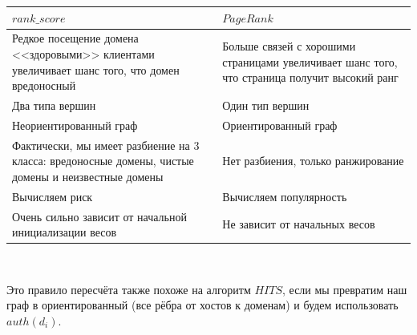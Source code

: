 \documentclass[a4paper,14pt]{extreport} %
\begin{document}
\begin{table}[H]
\begin{tabular}{|p{7cm}|p{7cm}|}
	\hline
	$rank\_score$                                                                                                                                                                       & $PageRank$                                                                                                                                                                  \\ \hline
	Редкое посещение домена <<здоровыми>> клиентами увеличивает шанс того, что домен вредоносный           & Больше связей с хорошими страницами увеличивает шанс того, что страница получит высокий ранг \\ \hline 
	Два типа вершин                                                                                                                                                        & Один тип вершин                                                                                                                                                \\ \hline
	Неориентированный граф                                                                                                                                         & Ориентированный граф                                                                                                                                     \\ \hline
	Фактически, мы имеет разбиение на 3 класса: вредоносные домены, чистые домены и неизвестные домены & Нет разбиения, только ранжирование                                                                                                            \\ \hline
	Вычисляем риск                                                                                                                                                         & Вычисляем популярность                                                                                                                                 \\ \hline
	Очень сильно зависит от начальной инициализации весов                                                                                & Не зависит от начальных весов                                                                                                                      \\ \hline
\end{tabular}
\\ 
\end{table}

Это правило пересчёта также похоже на алгоритм $HITS$, если мы превратим наш граф в ориентированный (все рёбра от хостов к доменам) и будем использовать $auth(d_i)$.
	
\end{document}
